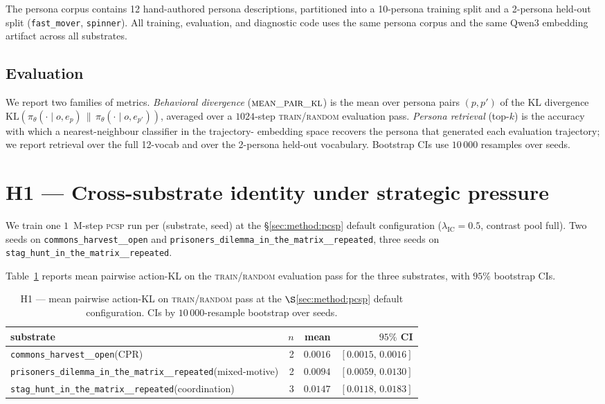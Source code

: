 \documentclass[11pt]{article}
\newcommand{\PCSP}{\textsc{pcsp}\xspace}
\newcommand{\cH}{\texttt{commons\_harvest\_\_open}\xspace}
\newcommand{\PD}{\texttt{prisoners\_dilemma\_in\_the\_matrix\_\_repeated}\xspace}
\newcommand{\stag}{\texttt{stag\_hunt\_in\_the\_matrix\_\_repeated}\xspace}
\begin{document}
The persona corpus contains 12 hand-authored persona descriptions, partitioned
into a 10-persona training split and a 2-persona held-out split
(\texttt{fast\_mover}, \texttt{spinner}). All training, evaluation, and
diagnostic code uses the same persona corpus and the same Qwen3 embedding
artifact across all substrates.

\subsection{Evaluation}

We report two families of metrics. \textit{Behavioral divergence}
($\textsc{mean\_pair\_kl}$) is the mean over persona pairs $(p, p')$ of the
KL divergence $\mathrm{KL}(\pi_\theta(\cdot \mid o, e_p) \,\|\,
\pi_\theta(\cdot \mid o, e_{p'}))$, averaged over a $1024$-step
\textsc{train/random} evaluation pass. \textit{Persona retrieval} (top-$k$)
is the accuracy with which a nearest-neighbour classifier in the trajectory-
embedding space recovers the persona that generated each evaluation
trajectory; we report retrieval over the full 12-vocab and over the 2-persona
held-out vocabulary. Bootstrap CIs use $10\,000$ resamples over seeds.

\section{H1 — Cross-substrate identity under strategic pressure}
\label{sec:h1}

We train one $1$~M-step \PCSP run per (substrate, seed) at the \S\ref{sec:method:pcsp}
default configuration ($\lambda_{\text{IC}} = 0.5$, contrast pool full). Two seeds
on \cH and \PD, three seeds on \stag.

Table~\ref{tab:h1} reports mean pairwise action-KL on the \textsc{train/random}
evaluation pass for the three substrates, with $95\%$ bootstrap CIs.

\begin{table}[t]
  \centering
  \caption{H1 — mean pairwise action-KL on \textsc{train/random} pass at the
  $\S$\ref{sec:method:pcsp} default configuration. CIs by $10\,000$-resample
  bootstrap over seeds.}
  \label{tab:h1}
  \begin{tabular}{lrrr}
    \toprule
    substrate & $n$ & mean & $95\%$ CI \\
    \midrule
    \cH (CPR)             & 2 & $0.0016$ & $[0.0015,\,0.0016]$ \\
    \PD (mixed-motive)    & 2 & $0.0094$ & $[0.0059,\,0.0130]$ \\
    \stag (coordination)  & 3 & $0.0147$ & $[0.0118,\,0.0183]$ \\
    \bottomrule
  \end{tabular}
\end{table}
\end{document}

